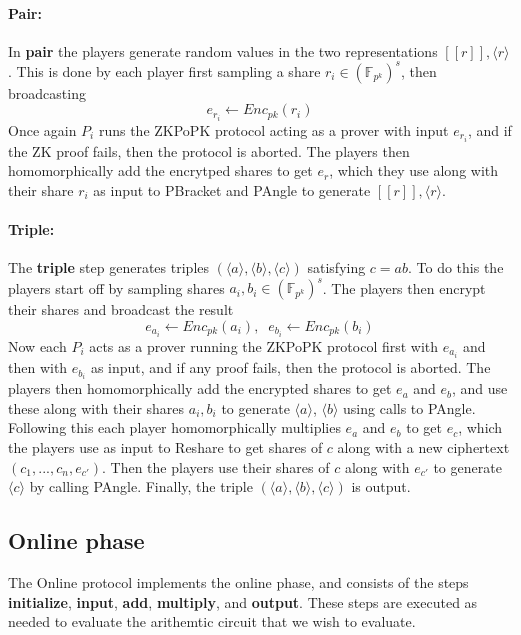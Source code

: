 \documentclass[../main.tex]{subfiles}
\begin{document}
\paragraph{Pair:}
In \textbf{pair} the players generate random values in the two representations $[\![ r ]\!], \langle r \rangle$. This is done by each player first sampling a share $r_i \in (\mathbb{F}_{p^k})^s$, then broadcasting $$e_{r_i} \leftarrow Enc_{pk}(r_i)$$
Once again $P_i$ runs the ZKPoPK protocol acting as a prover with input $e_{r_i}$, and if the ZK proof fails, then the protocol is aborted.
The players then homomorphically add the encrytped shares to get $e_r$, which they use along with their share $r_i$ as input to PBracket and PAngle to generate $[\![ r ]\!], \langle r \rangle$.

\paragraph{Triple:}
The \textbf{triple} step generates triples $(\langle a \rangle, \langle b \rangle, \langle c \rangle)$ satisfying $c = ab$. To do this the players start off by sampling shares $a_i, b_i \in (\mathbb{F}_{p^k})^s$.
The players then encrypt their shares and broadcast the result $$e_{a_i} \leftarrow Enc_{pk}(a_i), \;\; e_{b_i} \leftarrow Enc_{pk}(b_i)$$
Now each $P_i$ acts as a prover running the ZKPoPK protocol first with $e_{a_i}$ and then with $e_{b_i}$ as input, and if any proof fails, then the protocol is aborted.
The players then homomorphically add the encrypted shares to get $e_a$ and $e_b$, and use these along with their shares $a_i, b_i$ to generate $\langle a \rangle$, $\langle b \rangle$ using calls to PAngle.
Following this each player homomorphically multiplies $e_a$ and $e_b$ to get $e_c$, which the players use as input to Reshare to get shares of $c$ along with a new ciphertext $(c_1, ..., c_n, e_{c'})$. Then the players use their shares of $c$ along with $e_{c'}$ to generate $\langle c \rangle$ by calling PAngle. Finally, the triple $(\langle a \rangle, \langle b \rangle, \langle c \rangle)$ is output.


\subsection{Online phase} \label{subsection: Online}
The Online protocol implements the online phase,
and consists of the steps \textbf{initialize}, \textbf{input}, \textbf{add}, \textbf{multiply}, and \textbf{output}. These steps are executed as needed to evaluate the arithemtic circuit that we wish to evaluate.
\end{document}
